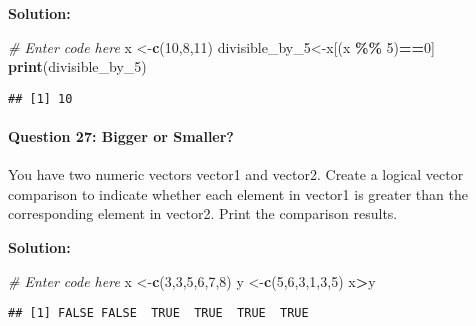 \documentclass[
]{article}
\newenvironment{Shaded}{\begin{snugshade}}{\end{snugshade}}
\newcommand{\CommentTok}[1]{\textcolor[rgb]{0.56,0.35,0.01}{\textit{#1}}}
\newcommand{\DecValTok}[1]{\textcolor[rgb]{0.00,0.00,0.81}{#1}}
\newcommand{\FunctionTok}[1]{\textcolor[rgb]{0.13,0.29,0.53}{\textbf{#1}}}
\newcommand{\NormalTok}[1]{#1}
\newcommand{\OtherTok}[1]{\textcolor[rgb]{0.56,0.35,0.01}{#1}}
\newcommand{\SpecialCharTok}[1]{\textcolor[rgb]{0.81,0.36,0.00}{\textbf{#1}}}
\begin{document}
\textbf{Solution:}

\begin{Shaded}
\begin{Highlighting}[]
\CommentTok{\# Enter code here}
\NormalTok{x }\OtherTok{\textless{}{-}}\FunctionTok{c}\NormalTok{(}\DecValTok{10}\NormalTok{,}\DecValTok{8}\NormalTok{,}\DecValTok{11}\NormalTok{)}
\NormalTok{divisible\_by\_5}\OtherTok{\textless{}{-}}\NormalTok{x[(x }\SpecialCharTok{\%\%} \DecValTok{5}\NormalTok{)}\SpecialCharTok{==}\DecValTok{0}\NormalTok{]}
\FunctionTok{print}\NormalTok{(divisible\_by\_5)}
\end{Highlighting}
\end{Shaded}

\begin{verbatim}
## [1] 10
\end{verbatim}

\hypertarget{question-27-bigger-or-smaller}{%
\paragraph{Question 27: Bigger or
Smaller?}\label{question-27-bigger-or-smaller}}

You have two numeric vectors vector1 and vector2. Create a logical
vector comparison to indicate whether each element in vector1 is greater
than the corresponding element in vector2. Print the comparison results.

\textbf{Solution:}

\begin{Shaded}
\begin{Highlighting}[]
\CommentTok{\# Enter code here}
\NormalTok{x }\OtherTok{\textless{}{-}}\FunctionTok{c}\NormalTok{(}\DecValTok{3}\NormalTok{,}\DecValTok{3}\NormalTok{,}\DecValTok{5}\NormalTok{,}\DecValTok{6}\NormalTok{,}\DecValTok{7}\NormalTok{,}\DecValTok{8}\NormalTok{)}
\NormalTok{y }\OtherTok{\textless{}{-}}\FunctionTok{c}\NormalTok{(}\DecValTok{5}\NormalTok{,}\DecValTok{6}\NormalTok{,}\DecValTok{3}\NormalTok{,}\DecValTok{1}\NormalTok{,}\DecValTok{3}\NormalTok{,}\DecValTok{5}\NormalTok{)}
\NormalTok{x}\SpecialCharTok{\textgreater{}}\NormalTok{y}
\end{Highlighting}
\end{Shaded}

\begin{verbatim}
## [1] FALSE FALSE  TRUE  TRUE  TRUE  TRUE
\end{verbatim}
\end{document}
